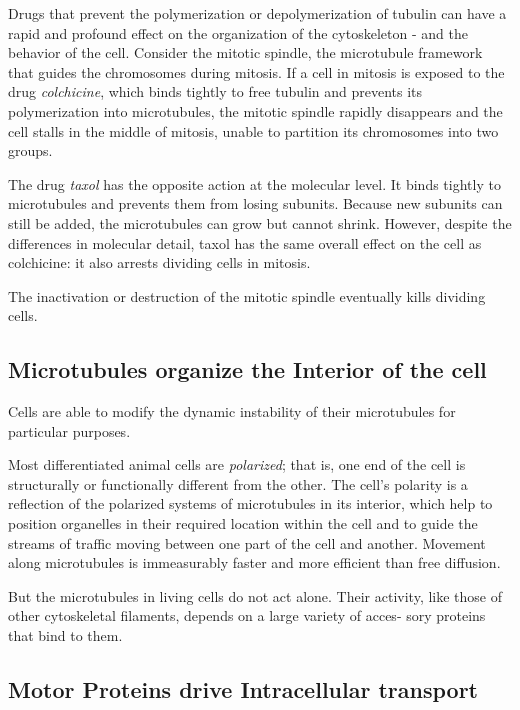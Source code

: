 Drugs that prevent the polymerization or depolymerization of tubulin can
have a rapid and profound effect on the organization of the cytoskeleton - and
the behavior of the cell. Consider the mitotic spindle, the microtubule
framework that guides the chromosomes during mitosis.
If a cell in mitosis is exposed to the drug \textit{colchicine}, which binds
tightly to free tubulin and prevents its polymerization into microtubules,
the mitotic spindle rapidly disappears and the cell stalls in the middle of
mitosis, unable to partition its chromosomes into two groups.

The drug \textit{taxol} has the opposite action at the molecular level. It binds
tightly to microtubules and prevents them from losing subunits. Because
new subunits can still be added, the microtubules can grow but cannot
shrink. However, despite the differences in molecular detail, taxol has
the same overall effect on the cell as colchicine: it also arrests dividing
cells in mitosis.

The inactivation or destruction of the mitotic spindle eventually kills
dividing cells.

\subsection{Microtubules organize the Interior of the cell}

Cells are able to modify the dynamic instability of their microtubules for
particular purposes.

Most differentiated animal cells are \textit{polarized}; that is, one end of the cell
is structurally or functionally different from the other. The cell’s polarity is a reflection of
the polarized systems of microtubules in its interior, which help to position
organelles in their required location within the cell and to guide the
streams of traffic moving between one part of the cell and another.
Movement along microtubules is immeasurably faster and more efficient than free diffusion.

But the microtubules in living cells do not act alone. Their activity, like
those of other cytoskeletal filaments, depends on a large variety of acces-
sory proteins that bind to them.

\subsection{Motor Proteins drive Intracellular transport}

